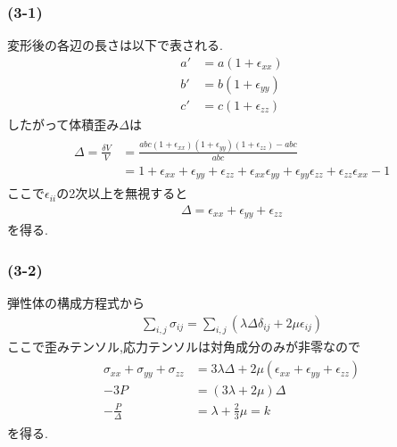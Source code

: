 \subsubsection*{(3-1)}
変形後の各辺の長さは以下で表される.
\begin{align}
  a'&=a(1+\epsilon_{xx})\\
  b'&=b(1+\epsilon_{yy})\\
  c'&=c(1+\epsilon_{zz})
\end{align}
したがって体積歪み$\Delta$は
\begin{align}
  \begin{split}
    \Delta=\frac{\delta V}{V}&=\frac{abc(1+\epsilon_{xx})(1+\epsilon_{yy})(1+\epsilon_{zz})-abc}{abc}\\
    &=1+\epsilon_{xx}+\epsilon_{yy}+\epsilon_{zz}+\epsilon_{xx}\epsilon_{yy}+\epsilon_{yy}\epsilon_{zz}+\epsilon_{zz}\epsilon_{xx}-1
  \end{split}
\end{align}
ここで$\epsilon_{ii}$の2次以上を無視すると
\begin{align}
  \Delta=\epsilon_{xx}+\epsilon_{yy}+\epsilon_{zz}
\end{align}
を得る.
\subsubsection*{(3-2)}
弾性体の構成方程式から
\begin{align}
  \sum_{i,j}\sigma_{ij}=\sum_{i,j}\left(\lambda\Delta\delta_{ij}+2\mu\epsilon_{ij}\right)
\end{align}
ここで歪みテンソル,応力テンソルは対角成分のみが非零なので
\begin{align}
  \begin{split}
    \sigma_{xx}+\sigma_{yy}+\sigma_{zz}&=3\lambda\Delta+2\mu(\epsilon_{xx}+\epsilon_{yy}+\epsilon_{zz})\\
    -3P&=(3\lambda+2\mu)\Delta\\
    -\frac{P}{\Delta}&=\lambda+\frac{2}{3}\mu=k
  \end{split}
\end{align}
を得る.